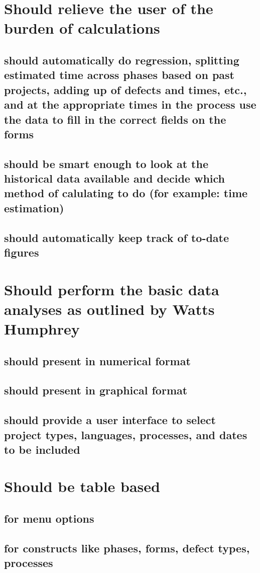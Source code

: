 \section{Should relieve the user of the burden of calculations}
\subsection{should automatically do regression, splitting estimated time
across phases based on past projects, adding up of defects and times, etc.,
and at the appropriate times in the process use the data to fill in the
correct fields on the forms}
\subsection{should be smart enough to look at the historical data available and decide
which method of calulating to do (for example: time estimation)}
\subsection{should automatically keep track of to-date figures}
\section{Should perform the basic data analyses as outlined by Watts
Humphrey}
\subsection{should present in numerical format}
\subsection{should present in graphical format}
\subsection{should provide a user interface to select project types,
languages, processes, and dates to be included}
\section{Should be table based}
\subsection{for menu options}
\subsection{for constructs like phases, forms, defect types, processes}
